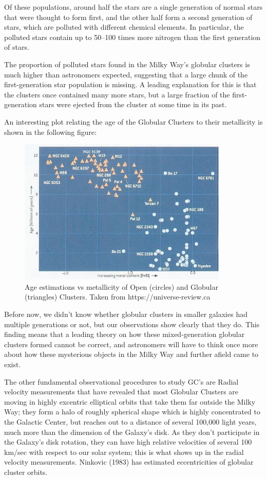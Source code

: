 Of these populations, around half the stars are a single generation of normal stars that were thought to form first, and the other half form a second generation of stars, which are polluted with different chemical elements. In particular, the polluted stars contain up to 50–100 times more nitrogen than the first generation of stars.

The proportion of polluted stars found in the Milky Way's globular clusters is much higher than astronomers expected, suggesting that a large chunk of the first-generation star population is missing. A leading explanation for this is that the clusters once contained many more stars, but a large fraction of the first-generation stars were ejected from the cluster at some time in its past.

An interesting plot relating the age of the Globular Clusters to their metallicity is shown in the following figure:

\begin{figure}[H]
\centering
\includegraphics[width=10cm]{images/metallicity_gcs.jpg}
\caption[Age vs Metallicity for some Globular Clusters]{Age estimations vs metallicity of Open (circles) and Globular (triangles) Clusters. Taken from https://universe-review.ca}
\end{figure}

Before now, we didn't know whether globular clusters in smaller galaxies had multiple generations or not, but our observations show clearly that they do. This finding means that a leading theory on how these mixed-generation globular clusters formed cannot be correct, and astronomers will have to think once more about how these mysterious objects in the Milky Way and further afield came to exist.

The other fundamental observational procedures to study GC's are Radial velocity measurements that have revealed that most Globular Clusters are moving in highly excentric elliptical orbits that take them far outside the Milky Way; they form a halo of roughly spherical shape which is highly concentrated to the Galactic Center, but reaches out to a distance of several 100,000 light years, much more than the dimension of the Galaxy's disk. As they don't participate in the Galaxy's disk rotation, they can have high relative velocities of several 100 km/sec with respect to our solar system; this is what shows up in the radial velocity measurements. Ninkovic (1983) has estimated eccentricities of globular cluster orbits.

